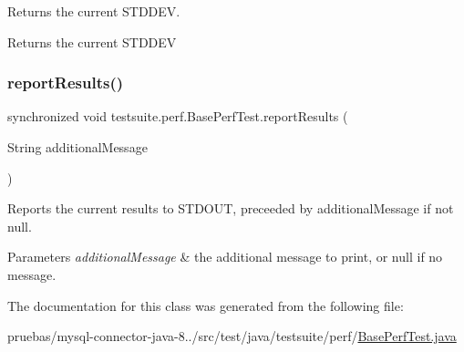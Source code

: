 Returns the current S\+T\+D\+D\+EV.

\begin{DoxyReturn}{Returns}
the current S\+T\+D\+D\+EV 
\end{DoxyReturn}
\mbox{\label{classtestsuite_1_1perf_1_1_base_perf_test_a88bddb3492e88ede49a0b70c63dc47b1}} 
\subsubsection{\texorpdfstring{report\+Results()}{reportResults()}}
{\footnotesize\ttfamily synchronized void testsuite.\+perf.\+Base\+Perf\+Test.\+report\+Results (\begin{DoxyParamCaption}\item[{String}]{additional\+Message }\end{DoxyParamCaption})\hspace{0.3cm}{\ttfamily [protected]}}

Reports the current results to S\+T\+D\+O\+UT, preceeded by {\ttfamily additional\+Message} if not null.


\begin{DoxyParams}{Parameters}
{\em additional\+Message} & the additional message to print, or null if no message. \\
\hline
\end{DoxyParams}


The documentation for this class was generated from the following file\+:\begin{DoxyCompactItemize}
\item 
pruebas/mysql-\/connector-\/java-\/8../src/test/java/testsuite/perf/\mbox{\hyperlink{_base_perf_test_8java}{Base\+Perf\+Test.\+java}}\end{DoxyCompactItemize}
